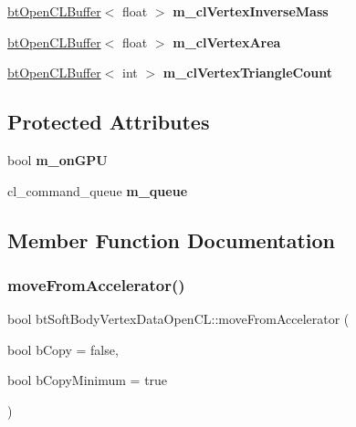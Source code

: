 \begin{DoxyCompactItemize}
\hyperlink{classbtOpenCLBuffer}{bt\+Open\+C\+L\+Buffer}$<$ float $>$ {\bfseries m\+\_\+cl\+Vertex\+Inverse\+Mass}
\item 
\mbox{\label{classbtSoftBodyVertexDataOpenCL_a2d76719fd8c62621b1210bae3906495f}} 
\hyperlink{classbtOpenCLBuffer}{bt\+Open\+C\+L\+Buffer}$<$ float $>$ {\bfseries m\+\_\+cl\+Vertex\+Area}
\item 
\mbox{\label{classbtSoftBodyVertexDataOpenCL_a0af2696f30acd220e637cb627c048ebc}} 
\hyperlink{classbtOpenCLBuffer}{bt\+Open\+C\+L\+Buffer}$<$ int $>$ {\bfseries m\+\_\+cl\+Vertex\+Triangle\+Count}
\end{DoxyCompactItemize}
\subsection*{Protected Attributes}
\begin{DoxyCompactItemize}
\item 
\mbox{\label{classbtSoftBodyVertexDataOpenCL_a4cfb2e78e607358d0f9f56314c29e9b3}} 
bool {\bfseries m\+\_\+on\+G\+PU}
\item 
\mbox{\label{classbtSoftBodyVertexDataOpenCL_ac60f428be45d3371b98b9e9f4836eb36}} 
cl\+\_\+command\+\_\+queue {\bfseries m\+\_\+queue}
\end{DoxyCompactItemize}


\subsection{Member Function Documentation}
\mbox{\label{classbtSoftBodyVertexDataOpenCL_a0ea115bf64323883e19e7bde57a998f1}} 
\subsubsection{\texorpdfstring{move\+From\+Accelerator()}{moveFromAccelerator()}\hspace{0.1cm}{\footnotesize\ttfamily [1/2]}}
{\footnotesize\ttfamily bool bt\+Soft\+Body\+Vertex\+Data\+Open\+C\+L\+::move\+From\+Accelerator (\begin{DoxyParamCaption}\item[{bool}]{b\+Copy = {\ttfamily false},  }\item[{bool}]{b\+Copy\+Minimum = {\ttfamily true} }\end{DoxyParamCaption})\hspace{0.3cm}{\ttfamily [virtual]}}

